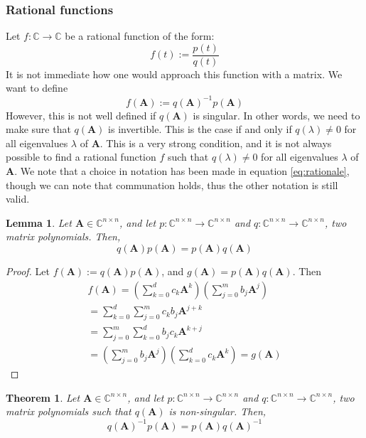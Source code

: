 \documentclass[11pt]{article}
\newtheorem{lemma}{Lemma}[section]
\newtheorem{theorem}{Theorem}[section]
\numberwithin{equation}{section}
\begin{document}
\subsubsection*{Rational functions}
Let $f:\mathbb{C}\rightarrow\mathbb{C}$ be a rational function of the form:
\begin{equation}
    f(t) := \frac{p(t)}{q(t)}
\end{equation}
It is not immediate how one would approach this function with a matrix. We want to define
\begin{equation}\label{eq:rationale}
    f(\mathbf{A}) := q(\mathbf{A})^{-1}p(\mathbf{A})
\end{equation}
However, this is not well defined if $q(\mathbf{A})$ is singular. In other words, we need to make sure that $q(\mathbf{A})$ is invertible. This is the case if and only if $q(\lambda) \neq 0$ for all eigenvalues $\lambda$ of $\mathbf{A}$. This is a very strong condition, and it is not always possible to find a rational function $f$ such that $q(\lambda) \neq 0$ for all eigenvalues $\lambda$ of $\mathbf{A}$. We note that a choice in notation has been made in equation \ref{eq:rationale}, though we can note that communation holds, thus the other notation is still valid.
\begin{lemma}\label{lem:commute}
     Let $\mathbf{A}\in\mathbb{C}^{n\times n}$, and let $p:\mathbb{C}^{n\times n}\rightarrow\mathbb{C}^{n\times n}$ and $q:\mathbb{C}^{n\times n}\rightarrow\mathbb{C}^{n\times n}$, two matrix polynomials. Then,
     \begin{equation}
         q(\mathbf{A})p(\mathbf{A}) = p(\mathbf{A})q(\mathbf{A})
     \end{equation}
\end{lemma}
\begin{proof}
    Let $f(\mathbf{A}) := q(\mathbf{A})p(\mathbf{A})$, and $g(\mathbf{A}) = p(\mathbf{A})q(\mathbf{A})$. Then
    \begin{align*}
        f(\mathbf{A}) = \left(\sum_{k=0}^d c_k\mathbf{A}^k\right)\left(\sum_{j=0}^m b_j\mathbf{A}^j\right)\\
        = \sum_{k=0}^d \sum_{j=0}^m c_kb_j\mathbf{A}^{j+k}\\
        = \sum_{j=0}^m \sum_{k=0}^d b_jc_k\mathbf{A}^{k+j}\\
        = \left(\sum_{j=0}^m b_j\mathbf{A}^j\right)\left(\sum_{k=0}^d c_k\mathbf{A}^k\right) = g(\mathbf{A})
    \end{align*}
\end{proof}
\begin{theorem}
    Let $\mathbf{A}\in\mathbb{C}^{n\times n}$, and let $p:\mathbb{C}^{n\times n}\rightarrow\mathbb{C}^{n\times n}$ and $q:\mathbb{C}^{n\times n}\rightarrow\mathbb{C}^{n\times n}$, two matrix polynomials such that $q(\mathbf{A})$ is non-singular. Then, 
    \begin{equation}
        q(\mathbf{A})^{-1}p(\mathbf{A}) = p(\mathbf{A})q(\mathbf{A})^{-1}
    \end{equation}
\end{theorem}
\end{document}
